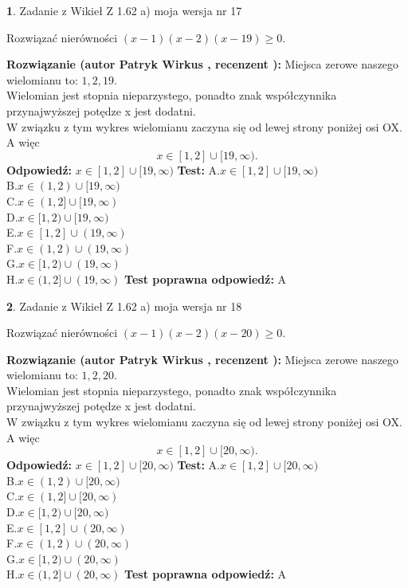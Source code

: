 \documentclass[12pt, a4paper]{article}
\theoremstyle{definition} %
\newtheorem{zad}{}
\newcommand{\zadStart}[1]{\begin{zad}#1\newline}
\newcommand{\zadStop}{\end{zad}}
\newcommand{\rozwStart}[2]{\noindent \textbf{Rozwiązanie (autor #1 , recenzent #2): }\newline}
\newcommand{\rozwStop}{\newline}
\newcommand{\odpStart}{\noindent \textbf{Odpowiedź:}\newline}
\newcommand{\odpStop}{\newline}
\newcommand{\testStart}{\noindent \textbf{Test:}\newline}
\newcommand{\testStop}{\newline}
\newcommand{\kluczStart}{\noindent \textbf{Test poprawna odpowiedź:}\newline}
\newcommand{\kluczStop}{\newline}
\begin{document}
\zadStart{Zadanie z Wikieł Z 1.62 a) moja wersja nr 17}

Rozwiązać nierówności $(x-1)(x-2)(x-19)\ge0$.
\zadStop
\rozwStart{Patryk Wirkus}{}
Miejsca zerowe naszego wielomianu to: $1, 2, 19$.\\
Wielomian jest stopnia nieparzystego, ponadto znak współczynnika przy\linebreak najwyższej potędze x jest dodatni.\\ W związku z tym wykres wielomianu zaczyna się od lewej strony poniżej osi OX. A więc $$x \in [1,2] \cup [19,\infty).$$
\rozwStop
\odpStart
$x \in [1,2] \cup [19,\infty)$
\odpStop
\testStart
A.$x \in [1,2] \cup [19,\infty)$\\
B.$x \in (1,2) \cup [19,\infty)$\\
C.$x \in (1,2] \cup [19,\infty)$\\
D.$x \in [1,2) \cup [19,\infty)$\\
E.$x \in [1,2] \cup (19,\infty)$\\
F.$x \in (1,2) \cup (19,\infty)$\\
G.$x \in [1,2) \cup (19,\infty)$\\
H.$x \in (1,2] \cup (19,\infty)$
\testStop
\kluczStart
A
\kluczStop



\zadStart{Zadanie z Wikieł Z 1.62 a) moja wersja nr 18}

Rozwiązać nierówności $(x-1)(x-2)(x-20)\ge0$.
\zadStop
\rozwStart{Patryk Wirkus}{}
Miejsca zerowe naszego wielomianu to: $1, 2, 20$.\\
Wielomian jest stopnia nieparzystego, ponadto znak współczynnika przy\linebreak najwyższej potędze x jest dodatni.\\ W związku z tym wykres wielomianu zaczyna się od lewej strony poniżej osi OX. A więc $$x \in [1,2] \cup [20,\infty).$$
\rozwStop
\odpStart
$x \in [1,2] \cup [20,\infty)$
\odpStop
\testStart
A.$x \in [1,2] \cup [20,\infty)$\\
B.$x \in (1,2) \cup [20,\infty)$\\
C.$x \in (1,2] \cup [20,\infty)$\\
D.$x \in [1,2) \cup [20,\infty)$\\
E.$x \in [1,2] \cup (20,\infty)$\\
F.$x \in (1,2) \cup (20,\infty)$\\
G.$x \in [1,2) \cup (20,\infty)$\\
H.$x \in (1,2] \cup (20,\infty)$
\testStop
\kluczStart
A
\kluczStop
\end{document}
